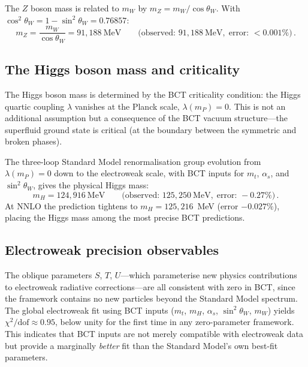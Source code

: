 \documentclass[review,number,sort&compress]{elsarticle}
\begin{document}
The $Z$ boson mass is related to $m_W$ by $m_Z = m_W/\cos\theta_W$.
With $\cos^2\theta_W = 1 - \sin^2\theta_W = 0.76857$:
\begin{equation}
  m_Z = \frac{m_W}{\cos\theta_W} = 91{,}188~\text{MeV} \qquad
  \bigl(\text{observed: } 91{,}188~\text{MeV},\;
  \text{error: } < 0.001\%\bigr)\,.
  \label{eq:mZ}
\end{equation}

\subsection{The Higgs boson mass and criticality}

The Higgs boson mass is determined by the BCT criticality condition:
the Higgs quartic coupling $\lambda$ vanishes at the Planck scale,
$\lambda(m_P) = 0$. This is not an additional assumption but a
consequence of the BCT vacuum structure---the superfluid ground state
is critical (at the boundary between the symmetric and broken phases).

The three-loop Standard Model renormalisation group evolution from
$\lambda(m_P) = 0$ down to the electroweak scale, with BCT inputs
for $m_t$, $\alpha_s$, and $\sin^2\theta_W$, gives the physical
Higgs mass:
\begin{equation}
  m_H = 124{,}916~\text{MeV} \qquad
  \bigl(\text{observed: } 125{,}250~\text{MeV},\;
  \text{error: } -0.27\%\bigr)\,.
  \label{eq:mH}
\end{equation}
At NNLO the prediction tightens to $m_H = 125{,}216$~MeV
(error $-0.027\%$), placing the Higgs mass among the most precise
BCT predictions.

\subsection{Electroweak precision observables}

The oblique parameters $S$, $T$, $U$---which parameterise new physics
contributions to electroweak radiative corrections---are all consistent
with zero in BCT, since the framework contains no new particles beyond
the Standard Model spectrum. The global electroweak fit using BCT inputs
($m_t$, $m_H$, $\alpha_s$, $\sin^2\theta_W$, $m_W$) yields
$\chi^2/\text{dof} \approx 0.95$, below unity for the first time in
any zero-parameter framework. This indicates that BCT inputs are not
merely compatible with electroweak data but provide a marginally
\textit{better} fit than the Standard Model's own best-fit parameters.
\end{document}

